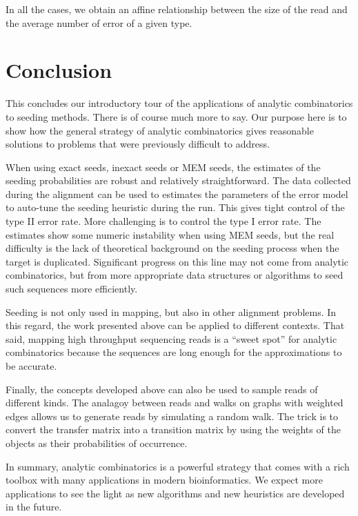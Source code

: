 \documentclass{article}
\begin{document}
In all the cases, we obtain an affine relationship between the size of the
read and the average number of error of a given type.


\section{Conclusion}

This concludes our introductory tour of the applications of analytic
combinatorics to seeding methods. There is of course much more to say. Our
purpose here is to show how the general strategy of analytic combinatorics
gives reasonable solutions to problems that were previously difficult to
address.

When using exact seeds, inexact seeds or MEM seeds, the estimates of the
seeding probabilities are robust and relatively straightforward. The data
collected during the alignment can be used to estimates the parameters of
the error model to auto-tune the seeding heuristic during the run. This
gives tight control of the type II error rate. More challenging is to
control the type I error rate. The estimates show some numeric instability
when using MEM seeds, but the real difficulty is the lack of theoretical
background on the seeding process when the target is duplicated.
Significant progress on this line may not come from analytic
combinatorics, but from more appropriate data structures or algorithms to
seed such sequences more efficiently.

Seeding is not only used in mapping, but also in other alignment problems.
In this regard, the work presented above can be applied to different
contexts. That said, mapping high throughput sequencing reads is a ``sweet
spot'' for analytic combinatorics because the sequences are long enough
for the approximations to be accurate.

Finally, the concepts developed above can also be used to sample reads of
different kinds. The analagoy between reads and walks on graphs with
weighted edges allows us to generate reads by simulating a random walk.
The trick is to convert the transfer matrix into a transition matrix by
using the weights of the objects as their probabilities of occurrence.

In summary, analytic combinatorics is a powerful strategy that comes with
a rich toolbox with many applications in modern bioinformatics. We expect
more applications to see the light as new algorithms and new heuristics
are developed in the future.









\end{document}

